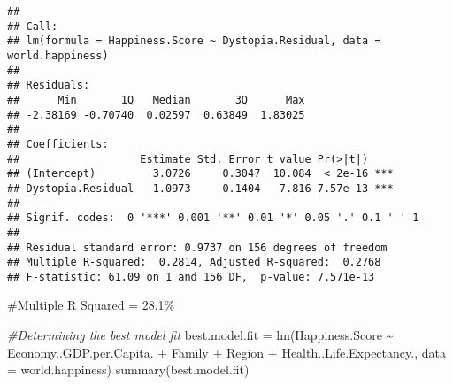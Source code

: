 \documentclass[
]{article}
\newenvironment{Shaded}{\begin{snugshade}}{\end{snugshade}}
\newcommand{\AttributeTok}[1]{\textcolor[rgb]{0.77,0.63,0.00}{#1}}
\newcommand{\CommentTok}[1]{\textcolor[rgb]{0.56,0.35,0.01}{\textit{#1}}}
\newcommand{\FunctionTok}[1]{\textcolor[rgb]{0.00,0.00,0.00}{#1}}
\newcommand{\NormalTok}[1]{#1}
\newcommand{\OtherTok}[1]{\textcolor[rgb]{0.56,0.35,0.01}{#1}}
\newcommand{\SpecialCharTok}[1]{\textcolor[rgb]{0.00,0.00,0.00}{#1}}
\begin{document}
\begin{verbatim}
## 
## Call:
## lm(formula = Happiness.Score ~ Dystopia.Residual, data = world.happiness)
## 
## Residuals:
##      Min       1Q   Median       3Q      Max 
## -2.38169 -0.70740  0.02597  0.63849  1.83025 
## 
## Coefficients:
##                   Estimate Std. Error t value Pr(>|t|)    
## (Intercept)         3.0726     0.3047  10.084  < 2e-16 ***
## Dystopia.Residual   1.0973     0.1404   7.816 7.57e-13 ***
## ---
## Signif. codes:  0 '***' 0.001 '**' 0.01 '*' 0.05 '.' 0.1 ' ' 1
## 
## Residual standard error: 0.9737 on 156 degrees of freedom
## Multiple R-squared:  0.2814, Adjusted R-squared:  0.2768 
## F-statistic: 61.09 on 1 and 156 DF,  p-value: 7.571e-13
\end{verbatim}

\#Multiple R Squared = 28.1\%

\begin{Shaded}
\begin{Highlighting}[]
\CommentTok{\#Determining the best model fit}
\NormalTok{best.model.fit }\OtherTok{=} \FunctionTok{lm}\NormalTok{(Happiness.Score }\SpecialCharTok{\textasciitilde{}}\NormalTok{ Economy..GDP.per.Capita. }\SpecialCharTok{+}\NormalTok{ Family }\SpecialCharTok{+}\NormalTok{ Region }\SpecialCharTok{+}\NormalTok{ Health..Life.Expectancy., }\AttributeTok{data =}\NormalTok{ world.happiness)}
\FunctionTok{summary}\NormalTok{(best.model.fit)}
\end{Highlighting}
\end{Shaded}
\end{document}
